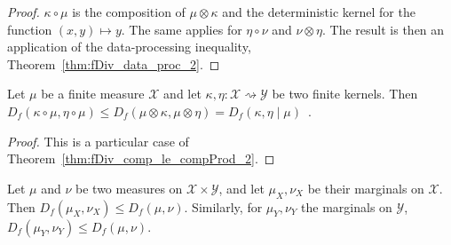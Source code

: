 \begin{proof}\leanok
{}
$\kappa \circ \mu$ is the composition of $\mu \otimes \kappa$ and the deterministic kernel for the function $(x,y) \mapsto y$. The same applies for $\eta \circ \nu$ and $\nu \otimes \eta$.
The result is then an application of the data-processing inequality, Theorem~\ref{thm:fDiv_data_proc_2}.
\end{proof}


%



\begin{theorem}
  \label{thm:fDiv_comp_le_condFDiv_2}
  \leanok
  Let $\mu$ be a finite measure $\mathcal X$ and let $\kappa, \eta : \mathcal X \rightsquigarrow \mathcal Y$ be two finite kernels.
  Then $D_f(\kappa \circ \mu, \eta \circ \mu) \le D_f(\mu \otimes \kappa, \mu \otimes \eta) = D_f(\kappa, \eta \mid \mu)$~.
\end{theorem}

\begin{proof}\leanok
{}
This is a particular case of Theorem~\ref{thm:fDiv_comp_le_compProd_2}.
\end{proof}


\begin{theorem}[Marginals]
  \label{thm:fDiv_fst_le_2}
  \leanok
  Let $\mu$ and $\nu$ be two measures on $\mathcal X \times \mathcal Y$, and let $\mu_X, \nu_X$ be their marginals on $\mathcal X$.
  Then $D_f(\mu_X, \nu_X) \le D_f(\mu, \nu)$.
  Similarly, for $\mu_Y, \nu_Y$ the marginals on $\mathcal Y$, $D_f(\mu_Y, \nu_Y) \le D_f(\mu, \nu)$.
\end{theorem}

